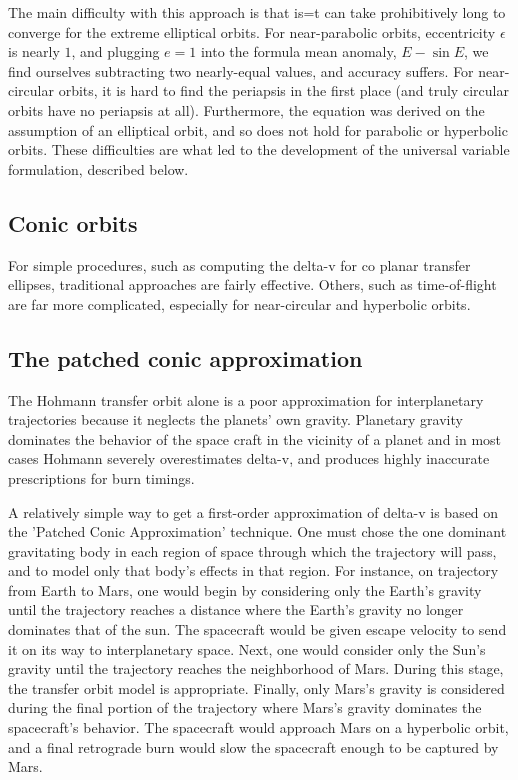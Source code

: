 \documentclass[12pt]{article}
\begin{document}
The main difficulty with this approach is that is=t can take prohibitively long to converge for the extreme elliptical orbits. For near-parabolic orbits, eccentricity \(\epsilon\) is nearly \(1\), and plugging \(e=1\) into the formula mean anomaly, \(E - \sin E\), we find ourselves subtracting two nearly-equal values, and accuracy suffers. For near-circular orbits, it is hard to find the periapsis in the first place (and truly circular orbits have no periapsis at all). Furthermore, the equation was derived on the assumption of an elliptical orbit, and so does not hold for parabolic or hyperbolic orbits. These difficulties are what led to the development of the universal variable formulation, described below.

\subsection{Conic orbits}

For simple procedures, such as computing the delta-v for co planar transfer ellipses, traditional approaches are fairly effective. Others, such as time-of-flight are far more complicated, especially for near-circular and hyperbolic orbits.

\subsection{The patched conic approximation}

The Hohmann transfer orbit alone is a poor approximation for interplanetary trajectories because it neglects the planets' own gravity. Planetary gravity dominates the behavior of the space craft in the vicinity of a planet and in most cases Hohmann severely overestimates delta-v, and produces highly inaccurate prescriptions for burn timings.

A relatively simple way to get a first-order approximation of delta-v is based on the 'Patched Conic Approximation' technique. One must chose the one dominant gravitating body in each region of space through which the trajectory will pass, and to model only that body's effects in that region. For instance, on trajectory from Earth to Mars, one would begin by considering only the Earth's gravity until the trajectory reaches a distance where the Earth's gravity no longer dominates that of the sun. The spacecraft would be given escape velocity to send it on its way to interplanetary space. Next, one would consider only the Sun's gravity until the trajectory reaches the neighborhood of Mars. During this stage, the transfer orbit model is appropriate. Finally, only Mars's gravity is considered during the final portion of the trajectory where Mars's gravity dominates the spacecraft's behavior. The spacecraft would approach Mars on a hyperbolic orbit, and a final retrograde burn would slow the spacecraft enough to be captured by Mars.
\end{document}
